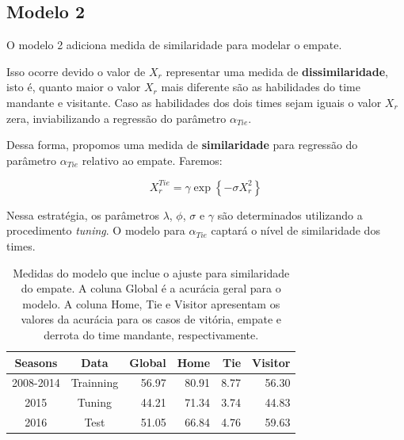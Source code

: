 \documentclass[doc,apacite,oneside,a4paper,12pt]{apa6}
\begin{document}
\newpage

\subsection{Modelo 2}
\label{sec:mod2}

O modelo 2 adiciona medida de similaridade para modelar o empate.


Isso ocorre devido o valor de $X_r$ representar uma medida de \textbf{dissimilaridade}, isto é, quanto maior o valor $X_r$ mais diferente são as habilidades do time mandante e visitante. Caso as habilidades dos dois times sejam iguais o valor  $X_r$ zera, inviabilizando a regressão do parâmetro $\alpha_{Tie}$. 

Dessa forma, propomos uma medida de \textbf{similaridade} para regressão do parâmetro $\alpha_{Tie}$ relativo ao empate. Faremos:

\begin{equation}
X_r^{Tie} = \gamma \exp{\left\{-\sigma X_r ^2\right\}}
\label{eq:transform}
\end{equation}

Nessa estratégia, os parâmetros $\lambda$, $\phi$, $\sigma$ e $\gamma$ são determinados utilizando a procedimento \textit{tuning}. O modelo para $\alpha_{Tie}$ captará o nível de similaridade dos times.


\begin{table}[ht]
\centering
\begin{tabular}{cc|r|rrr}
  \hline
Seasons & Data & \textbf{Global} & Home & Tie & Visitor \\ 
  \hline
2008-2014 & Trainning & 56.97 & 80.91 & 8.77 & 56.30 \\ 
  2015 & Tuning & 44.21 & 71.34 & 3.74 & 44.83 \\ 
  2016 & Test & 51.05 & 66.84 & 4.76 & 59.63 \\ 
   \hline
\end{tabular}
    \caption[\scriptsize{Medidas do modelo com similaridade para o empate.}]{\scriptsize{Medidas do modelo que inclue o ajuste para similaridade do empate. A coluna Global é a acurácia geral para o modelo. A coluna Home, Tie e Visitor apresentam os valores da acurácia para os casos de vitória, empate e derrota do time mandante, respectivamente. }}
    \label{tab:medidasmodsi}
\end{table}	
\end{document}
